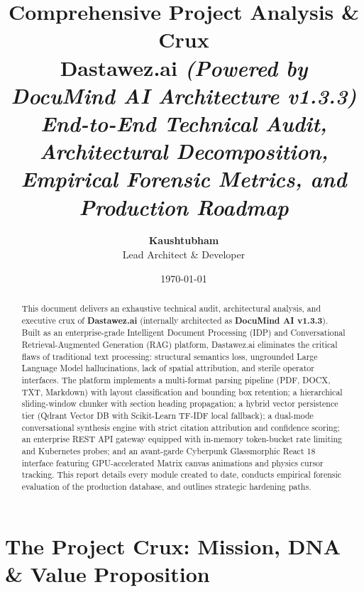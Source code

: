 \documentclass[11pt,a4paper]{article}
\title{
    \vspace{-1.5cm}
    \textbf{\Huge Comprehensive Project Analysis \& Crux}\\
    \vspace{0.4cm}
    \Large \textbf{Dastawez.ai} \textit{(Powered by DocuMind AI Architecture v1.3.3)}\\
    \vspace{0.2cm}
    \normalsize \textit{End-to-End Technical Audit, Architectural Decomposition, Empirical Forensic Metrics, and Production Roadmap}
}
\author{\textbf{Kaushtubham} \\ Lead Architect \& Developer}
\date{\today}
\begin{document}
\maketitle
\thispagestyle{empty}

\begin{abstract}
\noindent This document delivers an exhaustive technical audit, architectural analysis, and executive crux of \textbf{Dastawez.ai} (internally architected as \textbf{DocuMind AI v1.3.3}). Built as an enterprise-grade Intelligent Document Processing (IDP) and Conversational Retrieval-Augmented Generation (RAG) platform, Dastawez.ai eliminates the critical flaws of traditional text processing: structural semantics loss, ungrounded Large Language Model hallucinations, lack of spatial attribution, and sterile operator interfaces. The platform implements a multi-format parsing pipeline (PDF, DOCX, TXT, Markdown) with layout classification and bounding box retention; a hierarchical sliding-window chunker with section heading propagation; a hybrid vector persistence tier (Qdrant Vector DB with Scikit-Learn TF-IDF local fallback); a dual-mode conversational synthesis engine with strict citation attribution and confidence scoring; an enterprise REST API gateway equipped with in-memory token-bucket rate limiting and Kubernetes probes; and an avant-garde Cyberpunk Glassmorphic React 18 interface featuring GPU-accelerated Matrix canvas animations and physics cursor tracking. This report details every module created to date, conducts empirical forensic evaluation of the production database, and outlines strategic hardening paths.
\end{abstract}

\vspace{0.4cm}
\tableofcontents
\newpage

\section{The Project Crux: Mission, DNA \& Value Proposition}
\end{document}
